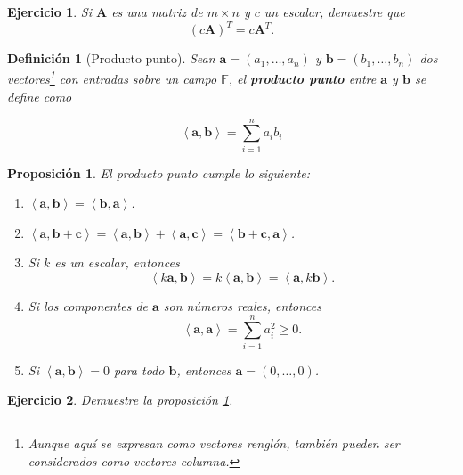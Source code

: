 \documentclass[11pt]{report}
\theoremstyle{break}
\newtheorem{definicion}{Definición}[chapter]
\newtheorem{proposicion}{Proposición}[chapter]
\newtheorem{ejercicio}{Ejercicio}[chapter]
\theoremstyle{break}
\newcommand{\mbb}[1]{$\mathbb{#1}$}
\newcommand{\matdim}[2]{$#1 \times #2$}
\begin{document}
\begin{ejercicio}
Si $\bm{A}$ es una matriz de \matdim{m}{n} y $c$ un escalar, demuestre que 
$$ (c\bm{A})^{T} = c\bm{A}^{T}.$$
\end{ejercicio}

\begin{definicion}[Producto punto]
\label{definicion:producto-punto}
Sean $\bm{a} = (a_1, \ldots, a_n) $ y $\bm{b} = (b_1, \ldots, b_n) $ dos vectores\footnote{Aunque aquí se expresan como vectores renglón, también pueden ser considerados como vectores columna.} con entradas sobre un campo \mbb{F}, el \textbf{producto punto} entre $\bm{a}$ y $\bm{b}$ se define como

$$ \left< \bm{a}, \bm{b} \right> = \sum_{i=1}^{n} a_{i}b_{i}  $$
\end{definicion}

\begin{proposicion}
\label{proposicion:propiedades-producto-punto}
El producto punto cumple lo siguiente:
\begin{enumerate}[label=\alph*)]
\item $ \left< \bm{a}, \bm{b} \right> = \left< \bm{b}, \bm{a} \right>$.
\item $\left< \bm{a}, \bm{b} + \bm{c} \right> = \left< \bm{a}, \bm{b} \right> + \left< \bm{a}, \bm{c} \right> = \left< \bm{b} + \bm{c}, \bm{a} \right>$.
\item Si $k$ es un escalar, entonces 
$$ \left< k\bm{a}, \bm{b} \right> = k\left< \bm{a}, \bm{b} \right> = \left< \bm{a}, k\bm{b} \right>.$$
\item Si los componentes de $\bm{a}$ son números reales, entonces
$$\left< \bm{a}, \bm{a} \right> = \sum_{i=1}^{n}a_{i}^{2} \geq 0.$$
\item Si $\left< \bm{a}, \bm{b} \right> = 0$ para todo $\bm{b}$, entonces $\bm{a} = (0,\ldots,0)$.
\end{enumerate}
\end{proposicion}

\begin{ejercicio}
Demuestre la proposición \ref{proposicion:propiedades-producto-punto}.
\end{ejercicio}
\end{document}
